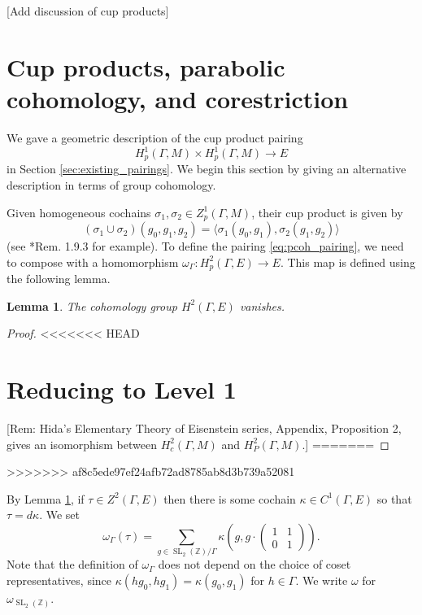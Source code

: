 \documentclass[10pt]{amsart}
\theoremstyle{plain}
\newtheorem{lemma}[theorem]{Lemma}
\theoremstyle{definition}
\newcommand{\ZZ}{{\mathbb{Z}}}
\DeclareMathOperator{\SL}{SL}
\begin{document}
[Add discussion of cup products]


\section{Cup products, parabolic cohomology, and corestriction}

We gave a geometric description of the cup product pairing
\begin{equation} \label{eq:pcoh_pairing}
H^1_p(\Gamma, M) \times H^1_p(\Gamma, M) \to E
\end{equation}
in Section \ref{sec:existing_pairings}.  We begin this section by giving an alternative description in terms of group cohomology.

Given homogeneous cochains $\sigma_1, \sigma_2 \in Z^1_p(\Gamma, M)$, their cup product is given by
\[
(\sigma_1 \cup \sigma_2)(g_0, g_1, g_2) = \langle \sigma_1(g_0, g_1), \sigma_2(g_1, g_2) \rangle
\]
(see \cite{Sharifi}*{Rem. 1.9.3} for example). To define the pairing \eqref{eq:pcoh_pairing}, we need to compose with a homomorphism $\omega_\Gamma : H^2_p(\Gamma, E) \to E$.  This map is defined using the following lemma.

\begin{lemma} \label{lem:H2E}
The cohomology group $H^2(\Gamma, E)$ vanishes.
\end{lemma}
\begin{proof}

<<<<<<< HEAD
\section{Reducing to Level 1} \label{sec:level_one}
[Rem: Hida's Elementary Theory of Eisenstein series, Appendix, Proposition 2, gives an isomorphism between $H^2_c(\Gamma, M)$ and $H^2_P(\Gamma, M)$.]
=======
\end{proof}
>>>>>>> af8c5ede97ef24afb72ad8785ab8d3b739a52081

By Lemma \ref{lem:H2E}, if $\tau \in Z^2(\Gamma, E)$ then there is some cochain $\kappa \in C^1(\Gamma, E)$ so that $\tau = d\kappa$.  We set
\[
\omega_\Gamma(\tau) = \sum_{g \in \SL_2(\ZZ) / \Gamma} \kappa\left(g, g \cdot \left(\begin{smallmatrix} 1 & 1 \\ 0 & 1 \end{smallmatrix}\right)\right).
\]
Note that the definition of $\omega_\Gamma$ does not depend on the choice of coset representatives, since $\kappa(hg_0, hg_1) = \kappa(g_0, g_1)$ for $h \in \Gamma$.  We write $\omega$ for $\omega_{\SL_2(\ZZ)}$.  
\end{document}
